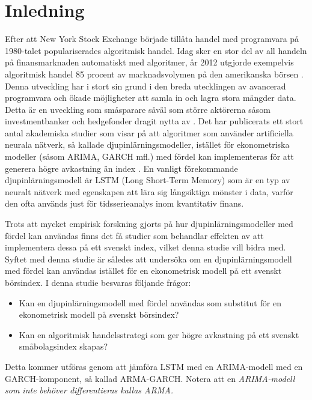 \documentclass[11pt]{article}
\numberwithin{equation}{section}
\numberwithin{table}{section}
\numberwithin{figure}{section}
\begin{document}
\newpage
\clearpage
\setcounter{page}{1}


\section{Inledning}
Efter att New York Stock Exchange började tillåta handel med programvara på 1980-talet populariserades algoritmisk handel.  Idag sker en stor del av all handeln på finansmarknaden automatiskt med algoritmer, år 2012 utgjorde exempelvis algoritmisk handel 85 procent av marknadsvolymen på den amerikanska börsen \parencite[][,s.258]{glantz2013multi}. Denna utveckling har i stort sin grund i den breda utecklingen av avancerad programvara och ökade möjligheter att samla in och lagra stora mängder data. Detta är en uveckling som småsparare såväl som större aktörerna såsom investmentbanker och hedgefonder dragit nytta av \parencite{DE_Shaw}. Det har publicerats ett stort antal akademiska studier som visar på att algoritmer som använder artificiella neurala nätverk, så kallade djupinlärningsmodeller, istället för ekonometriska modeller (såsom ARIMA, GARCH mfl.) med fördel kan implementeras för att generera högre avkastning än index \parencite{paliwal2009neural}. En vanligt förekommande djupinlärningsmodell är LSTM (Long Short-Term Memory) som är en typ av neuralt nätverk med egenskapen att lära sig långsiktiga mönster i data, varför den ofta används just för tidsserieanalys inom kvantitativ finans.

Trots att mycket empirisk forskning gjorts på hur djupinlärningsmodeller med fördel kan användas finns det få studier som behandlar effekten av att implementera dessa på ett svenskt index, vilket denna studie vill bidra med. Syftet med denna studie är således att undersöka om en djupinlärningsmodell med fördel kan användas istället för en ekonometrisk modell på ett svenskt börsindex. I denna studie besvaras följande frågor:

\begin{itemize}
    \item Kan en djupinlärningsmodell med fördel användas som substitut för en  ekonometrisk modell på svenskt börsindex?
    \item Kan en algoritmisk handelsstrategi som ger högre avkastning på ett svenskt småbolagsindex skapas?
\end{itemize}

Detta kommer utföras genom att jämföra LSTM med en ARIMA-modell med en GARCH-komponent, så kallad ARMA-GARCH. Notera att en \textit{ARIMA-modell som inte behöver differentieras kallas ARMA. }
\end{document}
